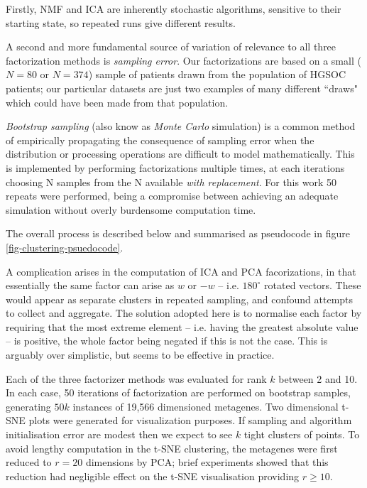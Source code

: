 \documentclass[tikz, 12pt,a4paper,oneside,fleqn]{article}
\begin{document}
Firstly, NMF and ICA are inherently stochastic algorithms, sensitive to their starting state, so repeated runs give different results.

A second and more fundamental source of variation of relevance to all three factorization methods is \emph{sampling error}.   Our factorizations are based on a small ($N=80$ or $N=374$) sample of patients drawn from the population of HGSOC patients; our particular datasets are just two examples of many different ``draws" which could have been made from that population.

\emph{Bootstrap sampling} (also know as \emph{Monte Carlo} simulation) is a common method of empirically propagating the consequence of sampling error when the distribution or processing operations are difficult to model mathematically.   This is implemented by performing factorizations multiple times, at each iterations choosing N samples from the N available \emph{with replacement}.   For this work 50 repeats were performed, being a compromise between achieving an adequate simulation without overly burdensome computation time.  

The overall process is described below and summarised as pseudocode in figure \ref{fig-clustering-psuedocode}.  

A complication arises in the computation of ICA and PCA facorizations, in that essentially the same factor can arise as $w$ or $-w$ -- i.e. $180^\circ$ rotated vectors. These would appear as separate clusters in repeated sampling, and confound attempts to collect and aggregate.  The solution adopted here is to normalise each factor by requiring that the most extreme element -- i.e. having the greatest absolute value -- is positive, the whole factor being negated if this is not the case.  This is arguably over simplistic, but seems to be effective in practice.

Each of the three factorizer methods was evaluated for rank $k$ between 2 and 10.  In each case, 50 iterations of factorization are performed on bootstrap samples, generating $50 k$ instances of 19,566 dimensioned metagenes.  Two dimensional t-SNE plots were generated for visualization purposes.   If sampling and algorithm initialisation error are modest then we expect to see $k$ tight clusters of points.   To avoid lengthy computation in the t-SNE clustering, the metagenes were first reduced to $r=20$ dimensions by PCA; brief experiments showed that this reduction had negligible effect on the t-SNE visualisation providing $r \geq 10$.   
\end{document}
